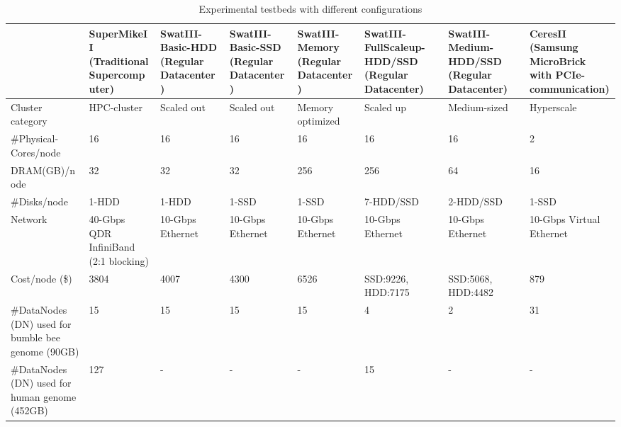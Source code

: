 \documentclass[conference]{IEEEtran}
\begin{document}
\begin{table}
\begin{center}
    \begin{tabular}{ |p{3.2cm} | p{1.6cm} | p{1.6cm} | p{1.6cm} | p{1.9cm} | p{1.6cm} | p{1.6cm}| p{1.9cm}|} \hline
    & SuperMikeII (Traditional Supercomputer) & SwatIII-Basic-HDD (Regular Datacenter) & SwatIII-Basic-SSD (Regular Datacenter)  & SwatIII-Memory (Regular Datacenter) & SwatIII-FullScaleup-HDD/SSD (Regular Datacenter) & SwatIII-Medium-HDD/SSD (Regular Datacenter) & CeresII (Samsung MicroBrick with PCIe-communication) \\ \hline
    Cluster category & HPC-cluster & Scaled out & Scaled out & Memory optimized & Scaled up & Medium-sized & Hyperscale\\ \hline  
    \#Physical-Cores/node & 16 & 16 & 16 & 16 & 16 & 16 & 2 \\ \hline %
    DRAM(GB)/node & 32 & 32 & 32 & 256 & 256 & 64 & 16  \\ \hline
    \#Disks/node & 1-HDD & 1-HDD & 1-SSD & 1-SSD & 7-HDD/SSD & 2-HDD/SSD & 1-SSD \\ \hline
    Network & 40-Gbps QDR InfiniBand (2:1 blocking) & 10-Gbps Ethernet & 10-Gbps Ethernet & 10-Gbps Ethernet & 10-Gbps Ethernet & 10-Gbps Ethernet & 10-Gbps Virtual Ethernet\\ \hline %
   Cost/node (\$) & 3804 & 4007 & 4300 & 6526 & SSD:9226, HDD:7175 & SSD:5068, HDD:4482 & 879\\ \hline
    \#DataNodes (DN) used for bumble bee genome (90GB) & 15 & 15 & 15 & 15 & 4 & 2 & 31 \\ \hline
    \#DataNodes (DN) used for human genome (452GB)& 127 & - & - & - & 15 & - & - \\ \hline
    \end{tabular}
    \caption{Experimental testbeds with different configurations}
	\label{table:Experimentaltestbeds}
\end{center}
\vspace{-1.5em}
\end{table}
\end{document}
